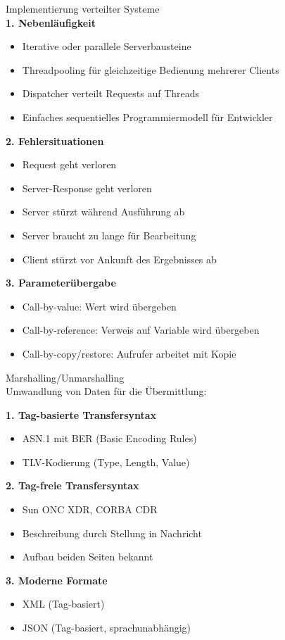 \begin{KR}{Implementierung verteilter Systeme}\\
\textbf{1. Nebenläufigkeit}
\begin{itemize}
    \item Iterative oder parallele Serverbausteine
    \item Threadpooling für gleichzeitige Bedienung mehrerer Clients
    \item Dispatcher verteilt Requests auf Threads
    \item Einfaches sequentielles Programmiermodell für Entwickler
\end{itemize}

\textbf{2. Fehlersituationen}
\begin{itemize}
    \item Request geht verloren
    \item Server-Response geht verloren
    \item Server stürzt während Ausführung ab
    \item Server braucht zu lange für Bearbeitung
    \item Client stürzt vor Ankunft des Ergebnisses ab
\end{itemize}

\textbf{3. Parameterübergabe}
\begin{itemize}
    \item Call-by-value: Wert wird übergeben
    \item Call-by-reference: Verweis auf Variable wird übergeben  
    \item Call-by-copy/restore: Aufrufer arbeitet mit Kopie
\end{itemize}
\end{KR}

\begin{concept}{Marshalling/Unmarshalling}\\
Umwandlung von Daten für die Übermittlung:

\textbf{1. Tag-basierte Transfersyntax}
\begin{itemize}
    \item ASN.1 mit BER (Basic Encoding Rules)
    \item TLV-Kodierung (Type, Length, Value)
\end{itemize}

\textbf{2. Tag-freie Transfersyntax}
\begin{itemize}
    \item Sun ONC XDR, CORBA CDR
    \item Beschreibung durch Stellung in Nachricht
    \item Aufbau beiden Seiten bekannt
\end{itemize}

\textbf{3. Moderne Formate}
\begin{itemize}
    \item XML (Tag-basiert)
    \item JSON (Tag-basiert, sprachunabhängig)
\end{itemize}
\end{concept}

